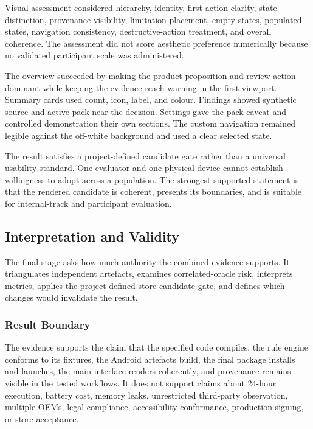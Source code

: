 Visual assessment considered hierarchy, identity, first-action clarity, state distinction, provenance visibility, limitation placement, empty states, populated states, navigation consistency, destructive-action treatment, and overall coherence. The assessment did not score aesthetic preference numerically because no validated participant scale was administered.

The overview succeeded by making the product proposition and review action dominant while keeping the evidence-reach warning in the first viewport. Summary cards used count, icon, label, and colour. Findings showed synthetic source and active pack near the decision. Settings gave the pack caveat and controlled demonstration their own sections. The custom navigation remained legible against the off-white background and used a clear selected state.

The result satisfies a project-defined candidate gate rather than a universal usability standard. One evaluator and one physical device cannot establish willingness to adopt across a population. The strongest supported statement is that the rendered candidate is coherent, presents its boundaries, and is suitable for internal-track and participant evaluation.

\subsection{Interpretation and Validity}

The final stage asks how much authority the combined evidence supports. It triangulates independent artefacts, examines correlated-oracle risk, interprets metrics, applies the project-defined store-candidate gate, and defines which changes would invalidate the result.

\subsubsection{Result Boundary}

The evidence supports the claim that the specified code compiles, the rule engine conforms to its fixtures, the Android artefacts build, the final package installs and launches, the main interface renders coherently, and provenance remains visible in the tested workflows. It does not support claims about 24-hour execution, battery cost, memory leaks, unrestricted third-party observation, multiple OEMs, legal compliance, accessibility conformance, production signing, or store acceptance.

